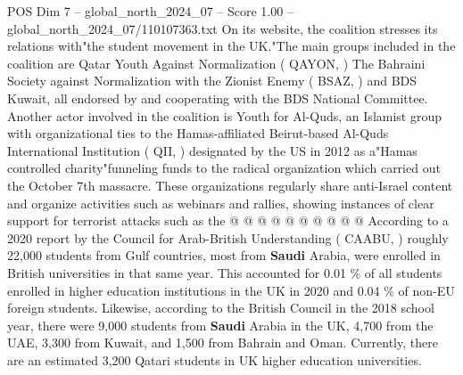 \begin{textsample}{POS Dim 7 – global\_north\_2024\_07 – Score 1.00 – global\_north\_2024\_07/110107363.txt}
On its website, the coalition stresses its relations with"the student movement in the UK."The main groups included in the coalition are Qatar Youth Against Normalization ( QAYON, ) The Bahraini Society against Normalization with the Zionist Enemy ( BSAZ, ) and BDS Kuwait, all endorsed by and cooperating with the BDS National Committee.
Another actor involved in the coalition is Youth for Al-Quds, an Islamist group with organizational ties to the Hamas-affiliated Beirut-based Al-Quds International Institution ( QII, ) designated by the US in 2012 as a"Hamas controlled charity"funneling funds to the radical organization which carried out the October 7th massacre.
These organizations regularly share anti-Israel content and organize activities such as webinars and rallies, showing instances of clear support for terrorist attacks such as the @ @ @ @ @ @ @ @ @ @ According to a 2020 report by the Council for Arab-British Understanding ( CAABU, ) roughly 22,000 students from Gulf countries, most from \textbf{Saudi} Arabia, were enrolled in British universities in that same year.
This accounted for 0.01 \% of all students enrolled in higher education institutions in the UK in 2020 and 0.04 \% of non-EU foreign students.
Likewise, according to the British Council in the 2018 school year, there were 9,000 students from \textbf{Saudi} Arabia in the UK, 4,700 from the UAE, 3,300 from Kuwait, and 1,500 from Bahrain and Oman.
Currently, there are an estimated 3,200 Qatari students in UK higher education universities.

\end{textsample}
